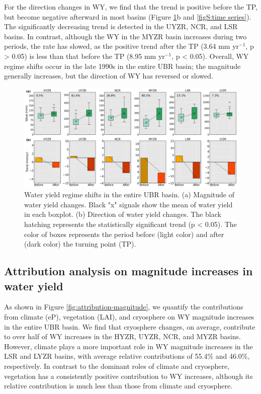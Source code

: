\documentclass[hess, manuscript]{copernicus}
\begin{document}
For the direction changes in WY, we find that the trend is positive before the TP, but become negative afterward in most basins (Figure \ref{fig:magnitude-direction}b and \ref{figS:time series}).
The significantly decreasing trend is detected in the UYZR, NCR, and LSR basins. 
In contrast, although the WY in the MYZR basin increases during two periods, the rate has slowed, as the positive trend after the TP (3.64 mm yr$^{−1}$, p > 0.05) is less than that before the TP (8.95 mm yr$^{−1}$, p < 0.05). 
Overall, WY regime shifts occur in the late 1990s in the entire UBR basin; the magnitude generally increases, but the direction of WY has reversed or slowed.

\begin{figure}[ht]
    \includegraphics[width=12cm]{02-figures/magnitude_and_direction.png}
    \caption
    {Water yield regime shifts in the entire UBR basin. 
    (a) Magnitude of water yield changes. Black "x" signals show the mean of water yield in each boxplot.  
    (b) Direction of water yield changes. The black hatching represents the statistically significant trend (p < 0.05).
    The color of boxes represents the period before (light color) and after (dark color) the turning point (TP).}
    \label{fig:magnitude-direction}
\end{figure}

\subsection{Attribution analysis on magnitude increases in water yield}
As shown in Figure \ref{fig:attribution-magnitude}, we quantify the contributions from climate (eP), vegetation (LAI), and cryosphere on WY magnitude increases in the entire UBR basin.
We find that cryosphere changes, on average, contribute to over half of WY increases in the HYZR, UYZR, NCR, and MYZR basins. 
However, climate plays a more important role in WY magnitude increases in the LSR and LYZR basins, with average relative contributions of 55.4\% and 46.0\%, respectively. 
In contrast to the dominant roles of climate and cryosphere, vegetation has a consistently positive contribution to WY increases, although its relative contribution is much less than those from climate and cryosphere.
\end{document}
